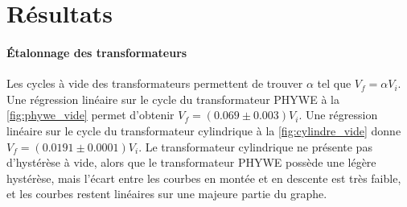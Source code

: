 \section{Résultats}

\paragraph{Étalonnage des transformateurs}
Les cycles à vide des transformateurs permettent de trouver \(\alpha\) tel que \(V_f = \alpha V_i\). Une régression linéaire sur le cycle du transformateur PHYWE à la \autoref{fig:phywe_vide} permet d'obtenir \mbox{\(V_f = (0.069 \pm 0.003) V_i\)}. Une régression linéaire sur le cycle du transformateur cylindrique à la \autoref{fig:cylindre_vide} donne \mbox{\(V_f = (0.0191 \pm 0.0001) V_i\)}. Le transformateur cylindrique ne présente pas d'hystérèse à vide, alors que le transformateur PHYWE possède une légère hystérèse, mais l'écart entre les courbes en montée et en descente est très faible, et les courbes restent linéaires sur une majeure partie du graphe.

